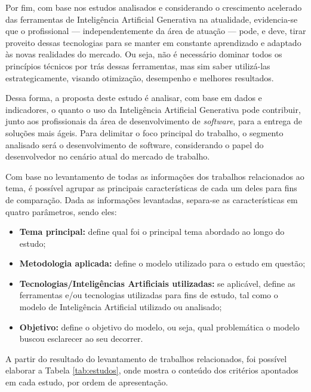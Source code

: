 \documentclass[english,brazilian]{UNISINOSartigo} %
\begin{document}
Por fim, com base nos estudos analisados e considerando o crescimento acelerado das ferramentas de Inteligência Artificial Generativa na atualidade, evidencia-se que o profissional — independentemente da área de atuação — pode, e deve, tirar proveito dessas tecnologias para se manter em constante aprendizado e adaptado às novas realidades do mercado. Ou seja, não é necessário dominar todos os princípios técnicos por trás dessas ferramentas, mas sim saber utilizá-las estrategicamente, visando otimização, desempenho e melhores resultados.

Dessa forma, a proposta deste estudo é analisar, com base em dados e indicadores, o quanto o uso da Inteligência Artificial Generativa pode contribuir, junto aos profissionais da área de desenvolvimento de \textit{software}, para a entrega de soluções mais ágeis. Para delimitar o foco principal do trabalho, o segmento analisado será o desenvolvimento de software, considerando o papel do desenvolvedor no cenário atual do mercado de trabalho.

Com base no levantamento de todas as informações dos trabalhos relacionados ao tema, é possível agrupar as principais características de cada um deles para fins de comparação. Dada as informações levantadas, separa-se as características em quatro parâmetros, sendo eles:

\begin{itemize}[leftmargin=1cm, itemsep=0.1em, topsep=0.1em]
    \item  \textbf{Tema principal:} define qual foi o principal tema abordado ao longo do estudo;
    \item \textbf{Metodologia aplicada:} define o modelo utilizado para o estudo em questão;
    \item \textbf{Tecnologias/Inteligências Artificiais utilizadas:} se aplicável, define as ferramentas e/ou tecnologias utilizadas para fins de estudo, tal como o modelo de Inteligência Artificial utilizado ou analisado;
    \item \textbf{Objetivo:} define o objetivo do modelo, ou seja, qual problemática o modelo buscou esclarecer ao seu decorrer.
\end{itemize}

A partir do resultado do levantamento de trabalhos relacionados, foi possível elaborar a Tabela \ref{tab:estudos}, onde mostra o conteúdo dos critérios apontados em cada estudo, por ordem de apresentação.
\end{document}
